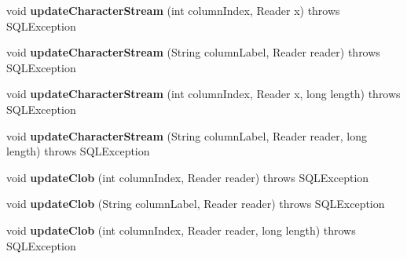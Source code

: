 \begin{DoxyCompactItemize}
void {\bfseries update\+Character\+Stream} (int column\+Index, Reader x)  throws S\+Q\+L\+Exception 
\item 
\mbox{\label{classcom_1_1mysql_1_1cj_1_1jdbc_1_1result_1_1_result_set_impl_a110b434a5b2ce0837303dd5f940eae55}} 
void {\bfseries update\+Character\+Stream} (String column\+Label, Reader reader)  throws S\+Q\+L\+Exception 
\item 
\mbox{\label{classcom_1_1mysql_1_1cj_1_1jdbc_1_1result_1_1_result_set_impl_a468cef5c5edb34686572400d1ea9d8bb}} 
void {\bfseries update\+Character\+Stream} (int column\+Index, Reader x, long length)  throws S\+Q\+L\+Exception 
\item 
\mbox{\label{classcom_1_1mysql_1_1cj_1_1jdbc_1_1result_1_1_result_set_impl_a816f26d641464baaff0b4a97bb8dc7cf}} 
void {\bfseries update\+Character\+Stream} (String column\+Label, Reader reader, long length)  throws S\+Q\+L\+Exception 
\item 
\mbox{\label{classcom_1_1mysql_1_1cj_1_1jdbc_1_1result_1_1_result_set_impl_a4b0f91ffe0051aae8862a2ea2ee9ea27}} 
void {\bfseries update\+Clob} (int column\+Index, Reader reader)  throws S\+Q\+L\+Exception 
\item 
\mbox{\label{classcom_1_1mysql_1_1cj_1_1jdbc_1_1result_1_1_result_set_impl_a3a9dad109e9890dc6319856aeaeb2c69}} 
void {\bfseries update\+Clob} (String column\+Label, Reader reader)  throws S\+Q\+L\+Exception 
\item 
\mbox{\label{classcom_1_1mysql_1_1cj_1_1jdbc_1_1result_1_1_result_set_impl_a45878d9a8985473017f7aa2d3f3968da}} 
void {\bfseries update\+Clob} (int column\+Index, Reader reader, long length)  throws S\+Q\+L\+Exception 
\item 
\mbox{\label{classcom_1_1mysql_1_1cj_1_1jdbc_1_1result_1_1_result_set_impl_a0631c05fe5d73a7e6e1fb50147b6b895}} 

\end{DoxyCompactItemize}
